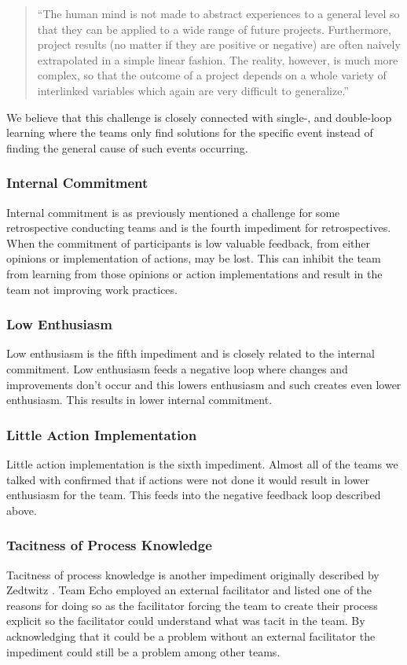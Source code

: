 \begin{quote}
``The human mind is not made to abstract experiences to a general level so that they can be applied to a wide range of future projects. Furthermore, project results (no matter if they are positive or negative) are often naively extrapolated in a simple linear fashion. The reality, however, is much more complex, so that the outcome of a project depends on a whole variety of interlinked variables which again are very difficult to generalize.''
\end{quote}

We believe that this challenge is closely connected with single-, and double-loop learning where the teams only find solutions for the specific event instead of finding the general cause of such events occurring.

\subsubsection{Internal Commitment}
Internal commitment is as previously mentioned a challenge for some retrospective conducting teams and is the fourth impediment for retrospectives. When the commitment of participants is low valuable feedback, from either opinions or implementation of actions, may be lost. This can inhibit the team from learning from those opinions or action implementations and result in the team not improving work practices. 

\subsubsection{Low Enthusiasm}
Low enthusiasm is the fifth impediment and is closely related to the internal commitment. Low enthusiasm feeds a negative loop where changes and improvements don't occur and this lowers enthusiasm and such creates even lower enthusiasm. This results in lower internal commitment. 

\subsubsection{Little Action Implementation}
Little action implementation is the sixth impediment. Almost all of the teams we talked with confirmed that if actions were not done it would result in lower enthusiasm for the team. This feeds into the negative feedback loop described above.

\subsubsection{Tacitness of Process Knowledge}
Tacitness of process knowledge is another impediment originally described by Zedtwitz \cite{Zedtwitz2002}. Team Echo employed an external facilitator and listed one of the reasons for doing so as the facilitator forcing the team to create their process explicit so the facilitator could understand what was tacit in the team. By acknowledging that it could be a problem without an external facilitator the impediment could still be a problem among other teams. 

